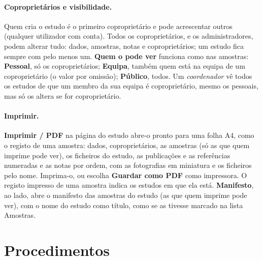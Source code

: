 \documentclass[11pt,a4paper]{article}
\newcommand{\ui}[1]{\textsf{\textbf{#1}}}
\newcommand{\menu}[1]{\textsf{#1}}
\begin{document}
\paragraph{Coproprietários e visibilidade.} Quem cria o estudo é o primeiro
coproprietário e pode acrescentar outros (qualquer utilizador com conta).
Todos os coproprietários, e os administradores, podem alterar tudo: dados,
amostras, notas e coproprietários; um estudo fica sempre com pelo menos um.
\ui{Quem o pode ver} funciona como nas amostras: \ui{Pessoal}, só os
coproprietários; \ui{Equipa}, também quem está na equipa de um
coproprietário (o valor por omissão); \ui{Público}, todos. Um
\emph{coordenador} vê todos os estudos de que um membro da sua equipa é
coproprietário, mesmo os pessoais, mas só os altera se for coproprietário.

\paragraph{Imprimir.} \ui{Imprimir / PDF} na página do estudo abre-o pronto
para uma folha A4, como o registo de uma amostra: dados, coproprietários, as
amostras (só as que quem imprime pode ver), os ficheiros do estudo, as publicações e as referências
numeradas e as
notas por ordem, com as fotografias em miniatura e os ficheiros pelo nome.
Imprima-o, ou escolha \ui{Guardar como PDF} como impressora. O registo
impresso de uma amostra indica os estudos em que ela está.
\ui{Manifesto}, ao lado, abre o manifesto das amostras do estudo (as que
quem imprime pode ver), com o nome do estudo como título, como se as tivesse
marcado na lista \menu{Amostras}.

\section{Procedimentos}\label{sec:procedures}
\end{document}
